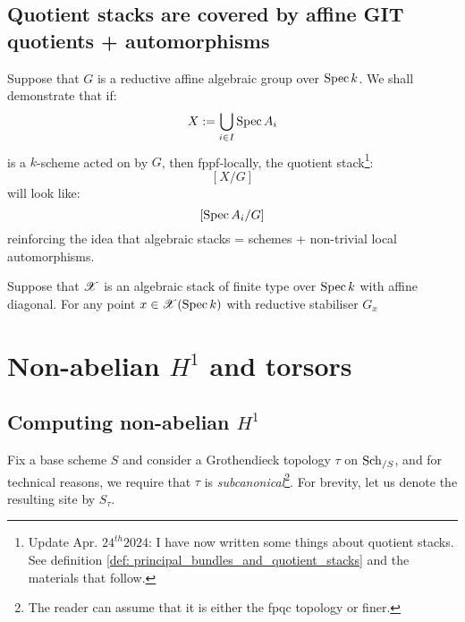         \subsection{Quotient stacks are covered by affine GIT quotients + automorphisms}
            Suppose that $G$ is a reductive affine algebraic group over $\operatorname{Spec} k$. We shall demonstrate that if:
                $$X := \bigcup_{i \in I} \operatorname{Spec} A_i$$
            is a $k$-scheme acted on by $G$, then fppf-locally, the quotient stack\footnote{Update Apr. $24^{th} 2024$: I have now written some things about quotient stacks. See definition \ref{def: principal_bundles_and_quotient_stacks} and the materials that follow.}:
                $$[X/G]$$
            will look like:
                $$[\operatorname{Spec} A_i/G]$$
            reinforcing the idea that algebraic stacks = schemes + non-trivial local automorphisms.

            \begin{theorem}
                Suppose that $\mathscr{X}$ is an algebraic stack of finite type over $\operatorname{Spec} k$ with affine diagonal. For any point $x \in \mathscr{X}(\operatorname{Spec} k)$ with reductive stabiliser $G_x$
            \end{theorem}

    \section{Non-abelian \texorpdfstring{$H^1$}{} and torsors}
        \subsection{Computing non-abelian \texorpdfstring{$H^1$}{}}
            \begin{convention}
                Fix a base scheme $S$ and consider a Grothendieck topology $\tau$ on $\mathrm{Sch}_{/S}$, and for technical reasons, we require that $\tau$ is \textit{subcanonical}\footnote{The reader can assume that it is either the fpqc topology or finer.}. For brevity, let us denote the resulting site by $S_{\tau}$. 
            \end{convention}

